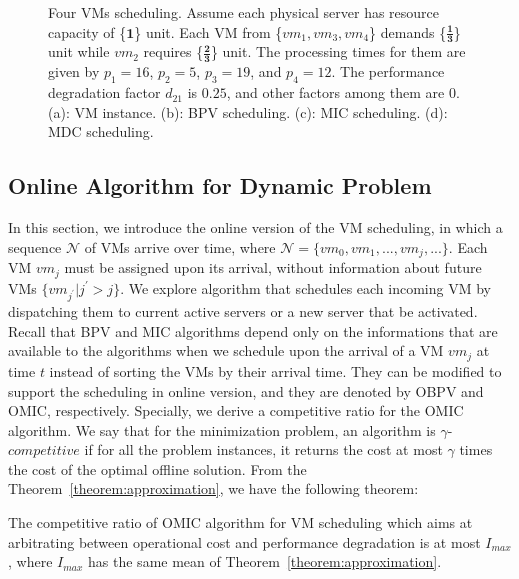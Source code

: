 \documentclass[10pt,journal]{IEEEtran}
\begin{document}
\begin{figure}
\caption{\label{fig:behaviour_algo}Four VMs scheduling. Assume each physical server has resource capacity of \{$\bm{1}$\} unit. Each VM from \{$vm_1,vm_3,vm_4$\} demands \{$\bm{\frac{1}{3}}$\} unit while $vm_2$ requires \{$\bm{\frac{2}{3}}$\} unit. The processing times for them are given by $p_1=16$, $p_2=5$, $p_3=19$, and $p_4=12$. The performance degradation factor $d_{21}$ is $0.25$, and other factors among them are $0$. (a): VM instance. (b): BPV scheduling. (c): MIC scheduling. (d): MDC scheduling.}
\end{figure}

\subsection{Online Algorithm for Dynamic Problem}
In this section, we introduce the online version of the VM scheduling, in which a sequence $\mathcal{N}$ of VMs arrive over time, where $\mathcal{N}=\{vm_0,vm_1,...,vm_j,...\}$. Each VM $vm_j$ must be assigned upon its arrival, without information about future VMs $\{vm_{j^{'}}|j^{'}>j\}$. We explore algorithm that schedules each incoming VM by dispatching them to current active servers or a new server that be activated. Recall that BPV and MIC algorithms depend only on the informations that are available to the algorithms when we schedule upon the arrival of a VM $vm_j$ at time $t$ instead of sorting the VMs by their arrival time. They can be modified to support the scheduling in online version, and they are denoted by OBPV and OMIC, respectively. Specially, we derive a competitive ratio for the OMIC algorithm. We say that for the minimization problem, an algorithm is $\gamma$-$competitive$ if for all the problem instances, it returns the cost at most $\gamma$ times the cost of the optimal offline solution. From the Theorem~\ref{theorem:approximation}, we have the following theorem:
\begin{theorem}
The competitive ratio of OMIC algorithm for VM scheduling which aims at arbitrating between operational cost and performance degradation is at most $I_{max}$, where $I_{max}$ has the same mean of Theorem~\ref{theorem:approximation}. \label{theorem:competitive}
\end{theorem}
\end{document}
